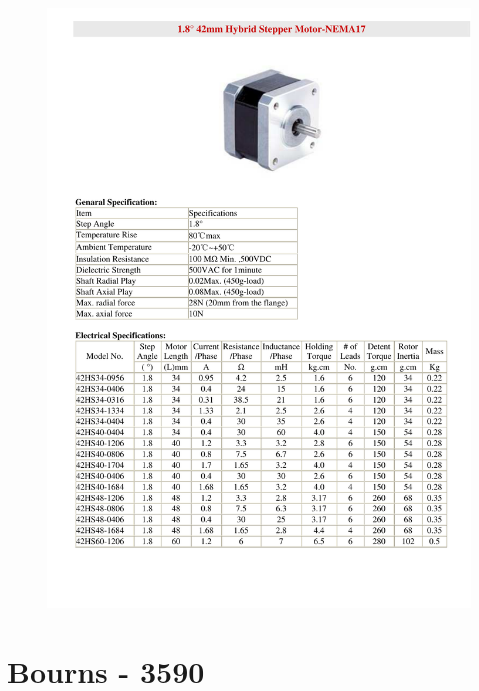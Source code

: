 \begin{figure}[h]   
\begin{centering}
\includegraphics[width=0.81\columnwidth]{datasheets/jk42.pdf}
\par\end{centering}

\end{figure}
\newpage

\section{Bourns - 3590}

\label{BournsPot}

